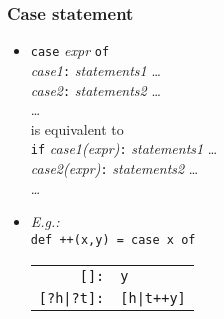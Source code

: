 \documentclass[12pt]{beamer}
\begin{document}
\begin{frame}
\frametitle{Case statement}
\begin{itemize}
\item \texttt{case} \emph{expr} \texttt{of} \\
\hspace*{1em} \emph{case1}\texttt{:} \emph{statements1} \ldots \\
\hspace*{1em} \emph{case2}\texttt{:} \emph{statements2} \ldots \\
\hspace*{1em} \ldots \\[2ex]
is equivalent to \\[2ex]
 \texttt{if} \emph{case1(expr)}\texttt{:} \emph{statements1} \ldots \\
\hspace*{1em} \emph{case2(expr)}\texttt{:} \emph{statements2} \ldots \\
\hspace*{1em} \ldots
\item \emph{E.g.:}\\
  \texttt{def ++(x,y) = case x of} \\
\hspace*{3em}
\begin{tabular}{rl}
\texttt{[]:} & \texttt{y}\\
\texttt{[?h|?t]:} & \texttt{[h|t++y]}\\
\end{tabular}
\end{itemize}
\end{frame}
\end{document}

